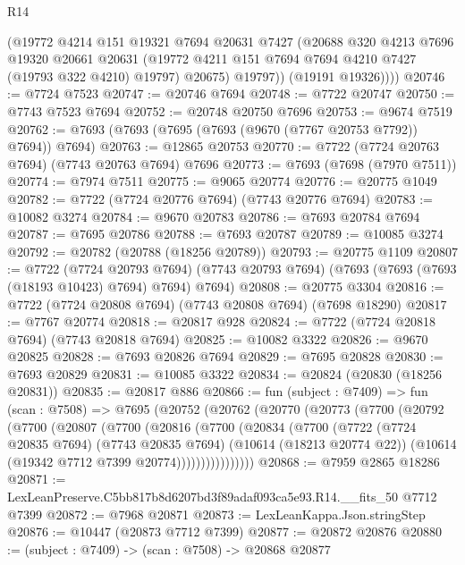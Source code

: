 \begin{lexlean}{R14}
\begin{coremodule}
            (@19772
              @4214
              @151
              @19321
              @7694
              @20631
              @7427
              (@20688
                @320
                @4213
                @7696
                @19320
                @20661
                @20631
                (@19772 @4211 @151 @7694 @7694 @4210 @7427 (@19793 @322 @4210) @19797)
                @20675)
              @19797))
          (@19191 @19326))))
@20746 := @7724 @7523
@20747 := @20746 @7694
@20748 := @7722 @20747
@20750 := @7743 @7523 @7694
@20752 := @20748 @20750 @7696
@20753 := @9674 @7519
@20762 := @7693 (@7693 (@7695 (@7693 (@9670 (@7767 @20753 @7792)) @7694)) @7694)
@20763 := @12865 @20753
@20770 := @7722 (@7724 @20763 @7694) (@7743 @20763 @7694) @7696
@20773 := @7693 (@7698 (@7970 @7511))
@20774 := @7974 @7511
@20775 := @9065 @20774
@20776 := @20775 @1049
@20782 := @7722 (@7724 @20776 @7694) (@7743 @20776 @7694)
@20783 := @10082 @3274
@20784 := @9670 @20783
@20786 := @7693 @20784 @7694
@20787 := @7695 @20786
@20788 := @7693 @20787
@20789 := @10085 @3274
@20792 := @20782 (@20788 (@18256 @20789))
@20793 := @20775 @1109
@20807 := @7722
    (@7724 @20793 @7694)
    (@7743 @20793 @7694)
    (@7693 (@7693 (@7693 (@18193 @10423) @7694) @7694) @7694)
@20808 := @20775 @3304
@20816 := @7722 (@7724 @20808 @7694) (@7743 @20808 @7694) (@7698 @18290)
@20817 := @7767 @20774
@20818 := @20817 @928
@20824 := @7722 (@7724 @20818 @7694) (@7743 @20818 @7694)
@20825 := @10082 @3322
@20826 := @9670 @20825
@20828 := @7693 @20826 @7694
@20829 := @7695 @20828
@20830 := @7693 @20829
@20831 := @10085 @3322
@20834 := @20824 (@20830 (@18256 @20831))
@20835 := @20817 @886
@20866 := fun (subject : @7409) =>
  fun (scan : @7508) =>
  @7695
    (@20752
      (@20762
        (@20770
          (@20773
            (@7700
              (@20792
                (@7700
                  (@20807
                    (@7700
                      (@20816
                        (@7700
                          (@20834
                            (@7700
                              (@7722
                                (@7724 @20835 @7694)
                                (@7743 @20835 @7694)
                                (@10614 (@18213 @20774 @22))
                                (@10614 (@19342 @7712 @7399 @20774))))))))))))))))
@20868 := @7959 @2865 @18286
@20871 := LexLeanPreserve.C5bb817b8d6207bd3f89adaf093ca5e93.R14.__fits_50 @7712 @7399
@20872 := @7968 @20871
@20873 := LexLeanKappa.Json.stringStep
@20876 := @10447 (@20873 @7712 @7399)
@20877 := @20872 @20876
@20880 := (subject : @7409) -> (scan : @7508) -> @20868 @20877

\end{coremodule}
\end{lexlean}
